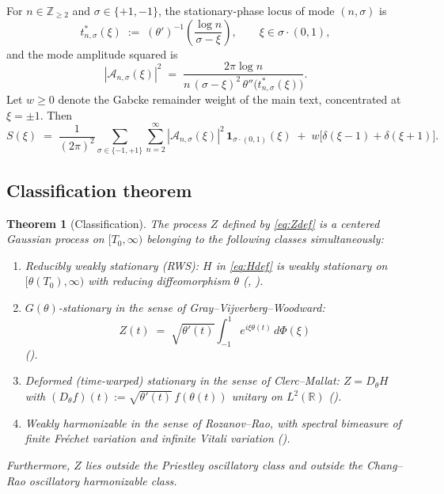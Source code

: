 \documentclass[11pt]{amsart}
\newtheorem{theorem}{Theorem}[section]
\theoremstyle{definition}
\begin{document}
For $n\in\mathbb{Z}_{\ge 2}$ and $\sigma\in\{+1,-1\}$, the
stationary-phase locus of mode $(n,\sigma)$ is
\begin{equation}\label{eq:tstar}
t^{*}_{n,\sigma}(\xi) \;:=\; (\theta')^{-1}\!\left(\frac{\log n}{\sigma-\xi}\right),
\qquad \xi\in\sigma\cdot(0,1),
\end{equation}
and the mode amplitude squared is
\begin{equation}\label{eq:amp}
|\mathcal{A}_{n,\sigma}(\xi)|^{2} \;=\; \frac{2\pi\log n}{n\,(\sigma-\xi)^{2}\,\theta''\!\bigl(t^{*}_{n,\sigma}(\xi)\bigr)}.
\end{equation}
Let $w\ge 0$ denote the Gabcke remainder weight of the main text,
concentrated at $\xi=\pm 1$. Then
\begin{equation}\label{eq:Sdef}
S(\xi) \;=\; \frac{1}{(2\pi)^{2}}\sum_{\sigma\in\{-1,+1\}}\sum_{n=2}^{\infty}|\mathcal{A}_{n,\sigma}(\xi)|^{2}\,\mathbf{1}_{\sigma\cdot(0,1)}(\xi)
\;+\; w\bigl[\delta(\xi-1)+\delta(\xi+1)\bigr].
\end{equation}

\subsection{Classification theorem}

\begin{theorem}[Classification]\label{thm:class}
The process $Z$ defined by \eqref{eq:Zdef} is a centered Gaussian process
on $[T_{0},\infty)$ belonging to the following classes simultaneously:
\begin{enumerate}
\item \emph{Reducibly weakly stationary} (RWS): $H$ in \eqref{eq:Hdef} is
weakly stationary on $[\theta(T_{0}),\infty)$ with reducing diffeomorphism
$\theta$ (\cite[Ch.~4]{Priestley1981}, \cite{GrayWoodward2005}).
\item \emph{$G(\theta)$-stationary} in the sense of Gray--Vijverberg--Woodward:
\begin{equation}\label{eq:gensp}
Z(t) \;=\; \sqrt{\theta'(t)}\int_{-1}^{1}e^{i\xi\theta(t)}\,d\Phi(\xi)
\end{equation}
(\cite{GrayWoodward2005}).
\item \emph{Deformed (time-warped) stationary} in the sense of Clerc--Mallat:
$Z = D_{\theta}H$ with $(D_{\theta}f)(t):=\sqrt{\theta'(t)}\,f(\theta(t))$
unitary on $L^{2}(\mathbb{R})$ (\cite{ClercMallat2003}).
\item \emph{Weakly harmonizable} in the sense of Rozanov--Rao, with
spectral bimeasure of finite Fr\'echet variation and infinite Vitali
variation (\cite{Rao1984,Loeve1978}).
\end{enumerate}
Furthermore, $Z$ lies outside the Priestley oscillatory class and outside
the Chang--Rao oscillatory harmonizable class.
\end{theorem}
\end{document}
